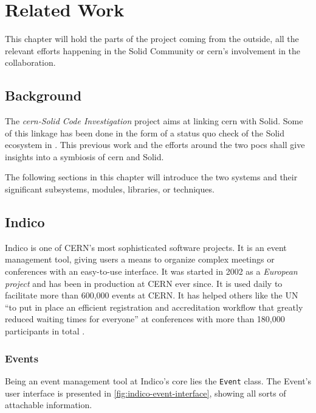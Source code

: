 \chapter{Related Work}
\setcounter{section}{0}

This chapter will hold the parts of the project coming from the outside, all the relevant efforts happening in the Solid Community or \gls{cern}'s involvement in the collaboration.

\section{Background}

The \textit{\gls{cern}-Solid Code Investigation} project aims at linking \gls{cern} with Solid. Some of this linkage has been done in the form of a status quo check of the Solid ecosystem in \cite{cern-solid-investigation-spec}. This previous work and the efforts around the two \glspl{poc} shall give insights into a symbiosis of \gls{cern} and Solid.

The following sections in this chapter will introduce the two systems and their significant subsystems, modules, libraries, or techniques. 

\section{Indico}

Indico is one of CERN’s most sophisticated software projects. It is an event management tool, giving users a means to organize complex meetings or conferences with an easy-to-use interface. It was started in 2002 as a \textit{European project} and has been in production at CERN ever since. It is used daily to facilitate more than 600,000 events at CERN. It has helped others like the UN “to put in place an efficient registration and accreditation workflow that greatly reduced waiting times for everyone” at conferences with more than 180,000 participants in total \cite{cern-solid-investigation-spec}.

\subsection{Events}

Being an event management tool at Indico's core lies the \texttt{Event} class. The Event's user interface is presented in \ref{fig:indico-event-interface}, showing all sorts of attachable information. 


